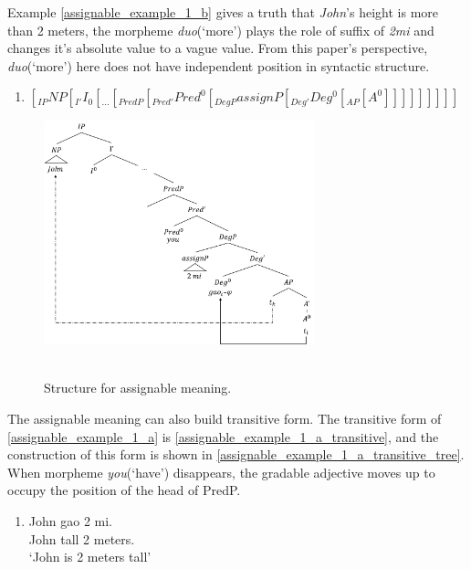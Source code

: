 \documentclass{ctexart}
\begin{document}
Example \ref{assignable_example_1_b} gives a truth that \textit{John}'s height is more than 2 meters, the morpheme \textit{duo}(`more') plays the role of suffix of \textit{2mi} and changes it's absolute value to a vague value. From this paper's perspective, \textit{duo}(`more') here does not have independent position in syntactic structure.

\begin{enumerate}
    \item \label{assignable_structure}
    $[_{IP} NP [_{I'} I_0[_{...}[_{PredP}[_{Pred'}Pred^0[_{DegP}assignP[_{Deg'}Deg^0[_{AP}[A^0]]]]]]]]]$
\end{enumerate}

\begin{figure}[H]
    \centering
    \includegraphics[width=0.7\textwidth]{pic/assignment_meaning.png}
    \begin{caption}
        \\ \vspace{-1.1ex}
        Structure for assignable meaning.
    \end{caption}
\end{figure}

The assignable meaning can also build transitive form. The transitive form of \ref{assignable_example_1_a} is \ref{assignable_example_1_a_transitive}, and the construction of this form is shown in \ref{assignable_example_1_a_transitive_tree}. When morpheme \textit{you}(`have') disappears, the gradable adjective moves up to occupy the position of the head of PredP.

\begin{enumerate}
    \item \label{assignable_example_1_a_transitive}
    John gao 2 mi. \\
    John tall 2 meters. \\
    `John is 2 meters tall'
\end{enumerate}
\end{document}
